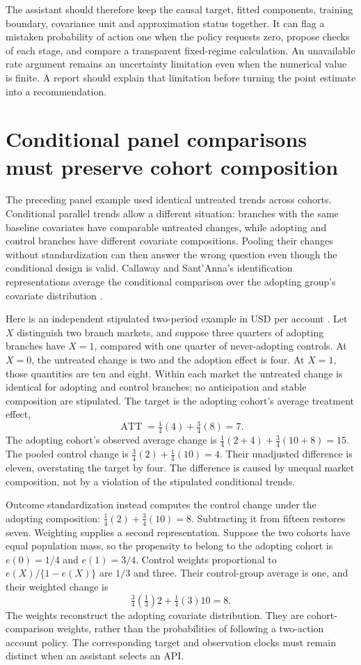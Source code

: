 The assistant should therefore keep the causal target, fitted components,
training boundary, covariance unit and approximation status together. It can
flag a mistaken probability of action one when the policy requests zero,
propose checks of each stage, and compare a transparent fixed-regime
calculation. An unavailable rate argument remains an uncertainty limitation
even when the numerical value is finite. A report should explain that
limitation before turning the point estimate into a recommendation.

\section{Conditional panel comparisons must preserve cohort composition}
\label{exec14:l5-composition}

The preceding panel example used identical untreated trends across cohorts.
Conditional parallel trends allow a different situation: branches with the
same baseline covariates have comparable untreated changes, while adopting
and control branches have different covariate compositions. Pooling their
changes without standardization can then answer the wrong question even
though the conditional design is valid. Callaway and Sant'Anna's
identification representations average the conditional comparison over the
adopting group's covariate distribution \citep{callaway2021}.

Here is an independent stipulated two-period example in USD per account
\citep{exec14_workflow_remainder}. Let $X$ distinguish two branch markets,
and suppose three quarters of adopting branches have $X=1$, compared with
one quarter of never-adopting controls. At $X=0$, the untreated change is two
and the adoption effect is four. At $X=1$, those quantities are ten and
eight. Within each market the untreated change is identical for adopting
and control branches; no anticipation and stable composition are stipulated.
The target is the adopting cohort's average treatment effect,
\[
 \operatorname{ATT}=\tfrac14(4)+\tfrac34(8)=7.
\]
The adopting cohort's observed average change is
$\tfrac14(2+4)+\tfrac34(10+8)=15$. The pooled control change is
$\tfrac34(2)+\tfrac14(10)=4$. Their unadjusted difference is eleven,
overstating the target by four. The difference is caused by unequal market
composition, not by a violation of the stipulated conditional trends.

Outcome standardization instead computes the control change under the
adopting composition: $\tfrac14(2)+\tfrac34(10)=8$. Subtracting it from
fifteen restores seven. Weighting supplies a second representation. Suppose
the two cohorts have equal population mass, so the propensity to belong to
the adopting cohort is $e(0)=1/4$ and $e(1)=3/4$. Control weights proportional
to $e(X)/\{1-e(X)\}$ are $1/3$ and three. Their control-group average is
one, and their weighted change is
\[
 \tfrac34\left(\tfrac13\right)2
 +\tfrac14(3)10=8.
\]
The weights reconstruct the adopting covariate distribution. They are
cohort-comparison weights, rather than the probabilities of following a
two-action account policy. The corresponding target and observation clocks
must remain distinct when an assistant selects an API.

